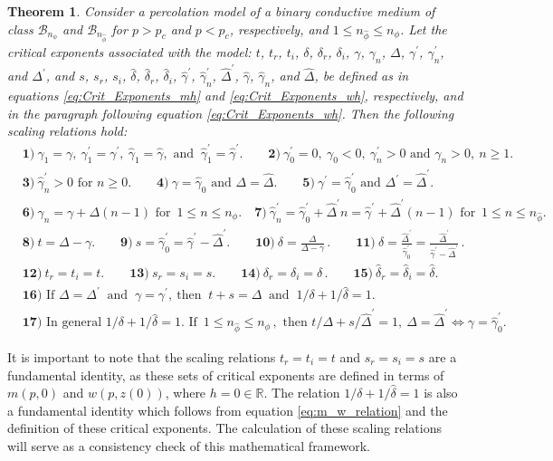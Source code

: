 \documentclass[english,12pt,jmp,graphicx]{revtex4-1}
\newtheorem{theorem}{Theorem}[section]
\newcommand{\ph}{\hat{\phi}}
\newcommand{\gh}{\hat{\gamma}}
\newcommand{\Dh}{\hat{\Delta}}
\newcommand{\dha}{\hat{\delta}}
\begin{document}
\begin{theorem} \label{thm:Crit_Theory_m_w}
Consider a percolation model of a binary conductive medium of class 
$\mathcal{B}_{n_\phi}$ and $\mathcal{B}_{n_{\ph}}$ for $p>p_c$ and
$p<p_c$, respectively, and $1\leq n_{\ph}\leq n_\phi$.
Let the critical exponents associated with the model: $t$, $t_r$,
$t_i$, $\delta$, $\delta_r$, $\delta_i$, $\gamma$, $\gamma_n$, $\Delta$, $\gamma^\prime$, $\gamma_n^\prime$, and $\Delta^\prime$, and 
$s$, $s_r$, $s_i$, $\dha$, $\dha_r$, $\dha_i$, $\gh^\prime$, $\gh_n^\prime$, $\Dh^\prime$,
$\gh$, $\gh_n$, and $\Dh$, be defined as in equations
\eqref{eq:Crit_Exponents_mh} and \eqref{eq:Crit_Exponents_wh},
respectively, and in the paragraph following equation
\eqref{eq:Crit_Exponents_wh}. Then the following scaling relations hold:   
%  
  \begin{align*}   
   &\mathbf{1)} \ \gamma_1=\gamma, \ \gamma_1^\prime=\gamma^\prime, \ \gh_1=\gh, \text{ and } \ \gh_1^\prime=\gh^\prime. \qquad
     \mathbf{2)} \ \gamma_0^\prime=0, \ \gamma_0<0, \ \gamma_n^\prime>0 \text{ and } \gamma_n>0, \ n\geq1.\\
   &\mathbf{3)} \ \gh_n^\prime>0 \text{ for } n\geq0. \qquad
   \mathbf{4)} \ \gamma=\gh_0 \text{ and } \Delta=\Dh. \qquad
   \mathbf{5)} \ \gamma^\prime=\gh_0^\prime \text{ and } \Delta^\prime=\Dh^\prime. \\
   &\mathbf{6)} \ \gamma_n=\gamma+\Delta(n-1) \text{ for } \,1\leq n\leq n_\phi. \quad
   \mathbf{7)} \ \gh_n^\prime=\gh_0^\prime+\Dh^\prime n=\gh^\prime+\Dh^\prime(n-1) \text{ for }
                \,1\leq n \leq n_{\ph}. \\
   &\mathbf{8)} \ t=\Delta-\gamma. \qquad 
   \mathbf{9)} \ s=\gh_0^\prime=\gh^\prime-\Dh^\prime. \qquad
   \mathbf{10)} \ \delta=\frac{\Delta}{\Delta-\gamma}\,. \qquad
   \mathbf{11)} \ \dha=\frac{\Dh^\prime}{\gh_0^\prime}=\frac{\Dh^\prime}{\gh^\prime-\Dh^\prime}\,. \\
   &\mathbf{12)} \ t_r=t_i=t. \qquad
   \mathbf{13)} \ s_r=s_i=s. \qquad
   \mathbf{14)}  \ \delta_r=\delta_i=\delta\,. \qquad
   \mathbf{15)} \ \dha_r=\dha_i=\dha. \\
   &\mathbf{16)} \text{ If } \Delta=\Delta^\prime \ \text{ and } \ \gamma=\gamma^\prime, \ \text{
     then } \ t+s=\Delta \ \text{ and } \ 1/\delta+1/\dha=1.\\
   &\mathbf{17)} \text{ In general } 1/\delta+1/\dha=1.
                 \text{ If } \,1\leq n_{\ph}\leq n_{\phi}\,,
                  \text{ then }  t/\Delta+s/\Dh^\prime=1, \
                 \Delta=\Dh^\prime\iff\gamma=\gh_0^\prime. 
  \end{align*}
%  
\end{theorem}
%
It is important to note that the scaling relations $t_r=t_i=t$ and
$s_r=s_i=s$ are a fundamental identity, as these sets of critical
exponents are defined in terms of $m(p,0)$ and $w(p,z(0))$, where
$h=0\in\mathbb{R}$. The relation $1/\delta+1/\dha=1$ is also a fundamental
identity which follows from equation \eqref{eq:m_w_relation} and the
definition of these critical exponents. The calculation of these
scaling relations will serve as a consistency check of this
mathematical framework.  
\end{document}
